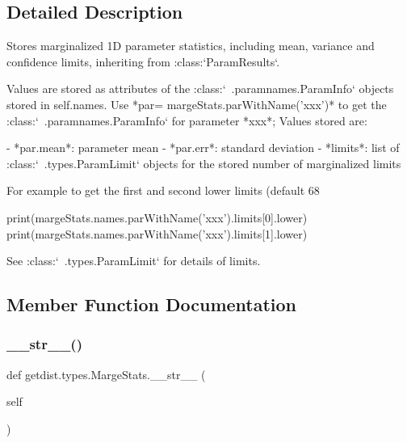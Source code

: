\subsection{Detailed Description}
\begin{DoxyVerb}Stores marginalized 1D parameter statistics, including mean, variance and confidence limits,
inheriting from :class:`ParamResults`. 

Values are stored as attributes of the :class:`~.paramnames.ParamInfo` objects stored in self.names.
Use *par= margeStats.parWithName('xxx')* to get the :class:`~.paramnames.ParamInfo` for parameter *xxx*; 
Values stored are:

- *par.mean*: parameter mean
- *par.err*: standard deviation
- *limits*: list of :class:`~.types.ParamLimit` objects for the stored number of marginalized limits
 
For example to get the first and second lower limits (default 68%

     print(margeStats.names.parWithName('xxx').limits[0].lower)
     print(margeStats.names.parWithName('xxx').limits[1].lower)
     
See  :class:`~.types.ParamLimit` for details of limits.
\end{DoxyVerb}
 

\subsection{Member Function Documentation}
\mbox{\label{classgetdist_1_1types_1_1MargeStats_ae9efeba91d3389c8a961b100fda0ec1c}} 
\subsubsection{\texorpdfstring{\+\_\+\+\_\+str\+\_\+\+\_\+()}{\_\_str\_\_()}}
{\footnotesize\ttfamily def getdist.\+types.\+Marge\+Stats.\+\_\+\+\_\+str\+\_\+\+\_\+ (\begin{DoxyParamCaption}\item[{}]{self }\end{DoxyParamCaption})}



